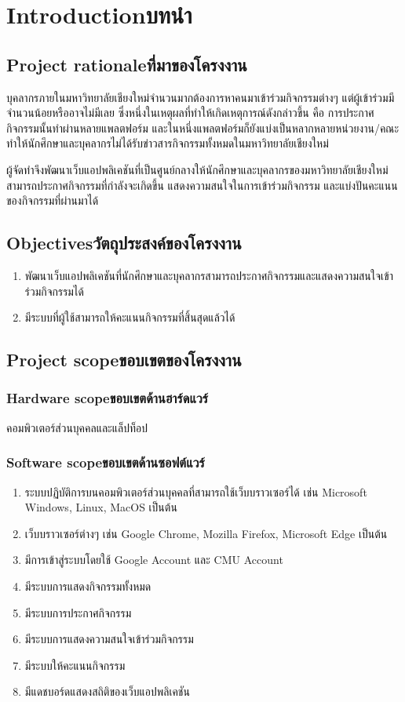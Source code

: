 \chapter{\ifenglish Introduction\else บทนำ\fi}

\section{\ifenglish Project rationale\else ที่มาของโครงงาน\fi}
\hspace{\parindent}บุคลากรภายในมหาวิทยาลัยเชียงใหม่จำนวนมากต้องการหาคนมาเข้าร่วมกิจกรรมต่างๆ แต่ผู้เข้าร่วมมีจำนวนน้อยหรืออาจไม่มีเลย
ซึ่งหนึ่งในเหตุผลที่ทำให้เกิดเหตุการณ์ดังกล่าวขึ้น คือ การประกาศกิจกรรมนั้นทำผ่านหลายแพลตฟอร์ม และในหนึ่งแพลตฟอร์มก็ยังแบ่งเป็นหลากหลายหน่วยงาน/คณะ
ทำให้นักศึกษาและบุคลากรไม่ได้รับข่าวสารกิจกรรมทั้งหมดในมหาวิทยาลัยเชียงใหม่ 

ผู้จัดทำจึงพัฒนาเว็บแอปพลิเคชันที่เป็นศูนย์กลางให้นักศึกษาและบุคลากรของมหาวิทยาลัยเชียงใหม่สามารถประกาศกิจกรรมที่กำลังจะเกิดขึ้น 
แสดงความสนใจในการเข้าร่วมกิจกรรม และแบ่งปันคะแนนของกิจกรรมที่ผ่านมาได้
\section{\ifenglish Objectives\else วัตถุประสงค์ของโครงงาน\fi}
\begin{enumerate}
    \item พัฒนาเว็บแอปพลิเคชันที่นักศึกษาและบุคลากรสามารถประกาศกิจกรรมและแสดงความสนใจเข้าร่วมกิจกรรมได้
    \item มีระบบที่ผู้ใช้สามารถให้คะแนนกิจกรรมที่สิ้นสุดแล้วได้
\end{enumerate}

\section{\ifenglish Project scope\else ขอบเขตของโครงงาน\fi}

\subsection{\ifenglish Hardware scope\else ขอบเขตด้านฮาร์ดแวร์\fi}
คอมพิวเตอร์ส่วนบุคคลและแล็ปท็อป
\subsection{\ifenglish Software scope\else ขอบเขตด้านซอฟต์แวร์\fi}
\begin{enumerate}
    \item ระบบปฏิบัติการบนคอมพิวเตอร์ส่วนบุคคลที่สามารถใช้เว็บบราวเซอร์ได้ เช่น Microsoft Windows, Linux, MacOS เป็นต้น
    \item เว็บบราวเซอร์ต่างๆ เช่น Google Chrome, Mozilla Firefox, Microsoft Edge เป็นต้น
    \item มีการเข้าสู่ระบบโดยใช้ Google Account และ CMU Account
    \item มีระบบการแสดงกิจกรรมทั้งหมด
    \item มีระบบการประกาศกิจกรรม
    \item มีระบบการแสดงความสนใจเข้าร่วมกิจกรรม
    \item มีระบบให้คะแนนกิจกรรม
    \item มีแดชบอร์ดแสดงสถิติของเว็บแอปพลิเคชัน
\end{enumerate}
